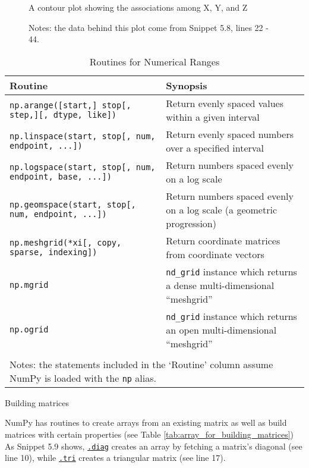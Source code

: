 \documentclass[a4paper,11pt]{book}
\numberwithin{figure}{chapter}
\numberwithin{table}{chapter}
\newcommand{\question}[1]{%
    \begin{tcolorbox}[colback=comp_c!10,colframe=comp_c,sidebyside align=top,width=\linewidth,before skip=1ex]
        #1
    \end{tcolorbox}
    \switchcolumn%
}
\newcommand{\note}[1]{%
    \begin{tcolorbox}[colback=white!0,colframe=white!10,width=\linewidth,before skip=1ex]
        #1
    \end{tcolorbox}
}
\begin{document}
\begin{figure}[!htbp]

\caption{A contour plot showing the associations among X, Y, and Z}
\caption*{Notes: the data behind this plot come from Snippet 5.8, lines 22 - 44.}
\label{fig:contour_plot}
\end{figure}

\begin{sidewaystable}[!htbp]
	\centering
	\caption{Routines for Numerical Ranges}
	\label{tab:array_from_numerical_ranges}
	\begin{tabular}{lp{12cm}}
		\toprule \toprule
			Routine & Synopsis \\
			\midrule
			\texttt{np.arange([start,] stop[, step,][, dtype, like])}&
			Return evenly spaced values within a given interval\\
			\texttt{np.linspace(start, stop[, num, endpoint, ...])}&
			Return evenly spaced numbers over a specified interval\\
			\texttt{np.logspace(start, stop[, num, endpoint, base, ...])}&
			Return numbers spaced evenly on a log scale\\
			\texttt{np.geomspace(start, stop[, num, endpoint, ...])}&
			Return numbers spaced evenly on a log scale (a geometric progression)\\
			\texttt{np.meshgrid(*xi[, copy, sparse, indexing])}&
			Return coordinate matrices from coordinate vectors\\
			\texttt{np.mgrid}&
			\texttt{nd\_grid} instance which returns a dense multi-dimensional ``meshgrid''\\
			\texttt{np.ogrid}&
			\texttt{nd\_grid} instance which returns an open multi-dimensional ``meshgrid''\\
			\bottomrule \\[-1.8ex]
			\multicolumn{2}{l}{Notes: the statements included in the `Routine' column assume NumPy is loaded with the \texttt{np} alias.} \\
	\end{tabular}
\end{sidewaystable}
\clearpage

\begin{paracol}{2}
	\question{\raggedright Building matrices}
	\note{NumPy has routines to create arrays from an existing matrix as well as build matrices with certain properties (see Table \ref{tab:array_for_building_matrices}) As Snippet 5.9 shows, \href{https://numpy.org/doc/stable/reference/generated/numpy.diag.html\#numpy.diag}{\texttt{.diag}} creates an array by fetching a matrix's diagonal (see line 10), while \href{https://numpy.org/doc/stable/reference/generated/numpy.tri.html\#numpy.tri}{\texttt{.tri}} creates a triangular matrix (see line 17).}
\end{paracol}
\end{document}
